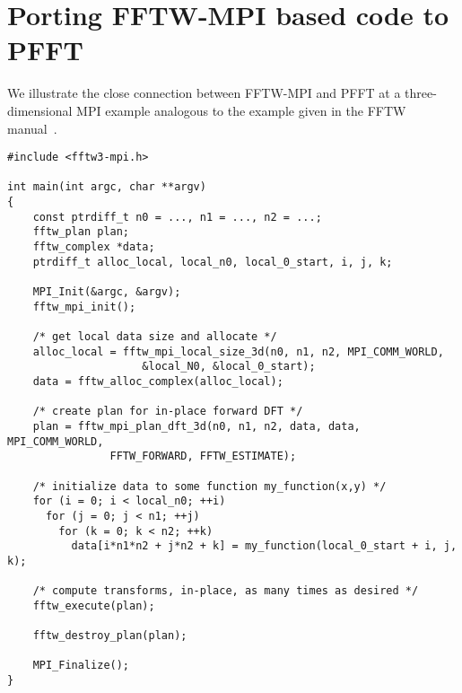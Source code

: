 \section{Porting FFTW-MPI based code to PFFT}\label{sec:porting}
We illustrate the close connection between FFTW-MPI and PFFT at a three-dimensional MPI example analogous to the example given in the FFTW manual~\cite{fftw-2dmpi}.
\begin{lstlisting}
#include <fftw3-mpi.h>
     
int main(int argc, char **argv)
{
    const ptrdiff_t n0 = ..., n1 = ..., n2 = ...;
    fftw_plan plan;
    fftw_complex *data;
    ptrdiff_t alloc_local, local_n0, local_0_start, i, j, k;

    MPI_Init(&argc, &argv);
    fftw_mpi_init();

    /* get local data size and allocate */
    alloc_local = fftw_mpi_local_size_3d(n0, n1, n2, MPI_COMM_WORLD,
					 &local_N0, &local_0_start);
    data = fftw_alloc_complex(alloc_local);

    /* create plan for in-place forward DFT */
    plan = fftw_mpi_plan_dft_3d(n0, n1, n2, data, data, MPI_COMM_WORLD,
				FFTW_FORWARD, FFTW_ESTIMATE);

    /* initialize data to some function my_function(x,y) */
    for (i = 0; i < local_n0; ++i) 
      for (j = 0; j < n1; ++j) 
        for (k = 0; k < n2; ++k)
          data[i*n1*n2 + j*n2 + k] = my_function(local_0_start + i, j, k);

    /* compute transforms, in-place, as many times as desired */
    fftw_execute(plan);

    fftw_destroy_plan(plan);

    MPI_Finalize();
}
\end{lstlisting}

